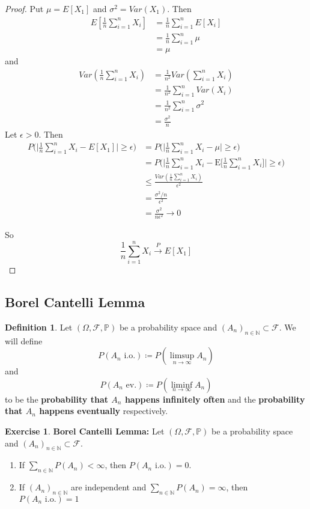 \documentclass[12pt]{amsart}
\theoremstyle{definition}
\newtheorem{defn}[definition]{Definition}
\newtheorem{ex}[definition]{Exercise}
\newcommand{\ep}{\epsilon}
\newcommand{\sig}{\sigma}
\newcommand{\Om}{\Omega}
\newcommand{\N}{\mathbb{N}}
\renewcommand{\P}{\mathbb{P}}
\newcommand{\MF}{\mathcal{F}}
\newcommand{\E}{\text{E}}
\newcommand{\io}{\text{ i.o.}}
\newcommand{\ev}{\text{ ev.}}
\newcommand{\conv}[1]{\xrightarrow{#1}}
\begin{document}
	\begin{proof}
		Put $\mu = E[X_1]$ and $\sig^2 = Var(X_1)$. Then 
		\begin{align*}
			E[\frac{1}{n}\sum_{i=1}^n X_i] 
			&= \frac{1}{n} \sum_{i=1}^nE[X_i] \\
			&= \frac{1}{n} \sum_{i=1}^n \mu \\
			&= \mu
		\end{align*} and 
		\begin{align*}
			Var(\frac{1}{n}\sum_{i=1}^n X_i) 
			&= \frac{1}{n^2} Var(\sum_{i=1}^n X_i) \\
			&= \frac{1}{n^2} \sum_{i=1}^n Var(X_i) \\
			&= \frac{1}{n^2} \sum_{i=1}^n \sig^2 \\
			&= \frac{\sig^2}{n}
		\end{align*}
		Let $\ep >0$. Then 
		\begin{align*}
			P\bigg(\bigg \vert \frac{1}{n} \sum_{i=1}^n X_i - E[X_1] \bigg \vert \geq \ep \bigg) 
			& = P\bigg(\bigg\vert \frac{1}{n} \sum_{i=1}^n X_i - \mu \bigg\vert \geq \ep\bigg) \\
			& = P\bigg(\bigg\vert \frac{1}{n} \sum_{i=1}^n X_i - \E\bigg[\frac{1}{n}\sum_{i=1}^n X_i \bigg] \bigg\vert \geq \ep\bigg) \\ 
			&\leq \frac{Var(\frac{1}{n} \sum_{i=1}^n X_i)}{\ep^2} \\
			& =  \frac{\sig^2 / n}{\ep^2} \\
			&= \frac{\sig^2}{n\ep^2} \rightarrow 0
		\end{align*}
		
		So $$\frac{1}{n}\sum_{i=1}^n X_i \conv{P} E[X_1]$$
	\end{proof}
	
	\subsection{Borel Cantelli Lemma} 
	
	\begin{defn}
		Let $(\Om, \MF, \P)$ be a probability space and $(A_n)_{n \in \N} \subset \MF$. We will define $$P(A_n \io) \coloneqq P(\limsup_{n \rightarrow \infty}A_n) $$ and $$P(A_n \ev) \coloneqq P(\liminf_{n \rightarrow \infty} A_n)$$ to be the \textbf{probability that $A_n$ happens infinitely often} and the \textbf{probability that $A_n$ happens eventually} respectively.  
	\end{defn}
	
	\begin{ex}\textbf{Borel Cantelli Lemma:}
		Let $(\Om, \MF, \P)$ be a probability space and $(A_n)_{n \in \N} \subset \MF$.
		\begin{enumerate}
			\item If $\sum\limits_{n \in \N}P(A_n) < \infty$, then $P(A_n \io) = 0$.
			\item If $(A_n)_{n \in \N}$ are independent and $\sum\limits_{n \in \N} P(A_n) = \infty$, then $P(A_n \io) = 1$  
		\end{enumerate}
	\end{ex}
	
\end{document}
